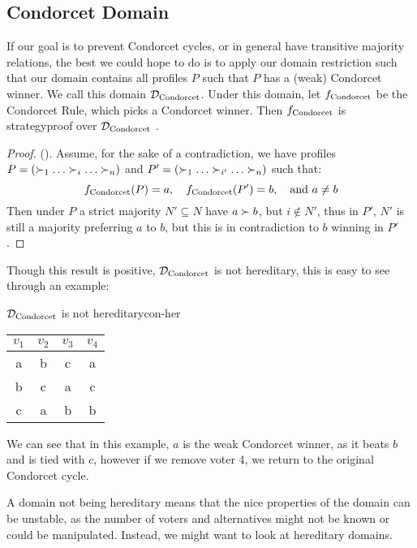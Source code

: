 \subsection{Condorcet Domain}
If our goal is to prevent Condorcet cycles, or in general have transitive majority relations, the best we could hope to do is to apply our domain restriction such that our domain contains all profiles $P$ such that $P$ has a (weak) Condorcet winner. We call this domain $\mathcal{D}_{\text{Condorcet}}$. Under this domain, let $f_{\text{Condorcet}}$ be the Condorcet Rule, which picks a Condorcet winner. Then $f_{\text{Condorcet}}$ is strategyproof over $\mathcal{D}_{\text{Condorcet}}$ \citep{Elkind_Lackner_Peters_2022}.

\begin{proof}{(\citet{Elkind_Lackner_Peters_2022}).} 
	Assume, for the sake of a contradiction, we have profiles $P = (\pref_1 \dots \pref_i \dots \pref_n)$ and $P' = (\pref_1 \dots \pref_{i'} \dots \pref_n)$ such that:
	\[
		f_{\text{Condorcet}}(P) = a, \quad f_{\text{Condorcet}}(P') = b, \quad \text{and } a \neq b
	\]
	Then under $P$ a strict majority $N' \subseteq N$ have $a \succ b$, but $i \notin N'$, thus in $P'$, $N'$ is still a majority preferring $a$ to $b$, but this is in contradiction to $b$ winning in $P'$.
\end{proof}


Though this result is positive, $\mathcal{D}_{\text{Condorcet}}$ is not hereditary, this is easy to see through an example:
\begin{example}{$\mathcal{D}_{\text{Condorcet}}$ is not hereditary}{con-her}
	\begin{minipage}{0.25\linewidth}
		\begin{tabular}{cccc}
			\toprule
			$v_1$ & $v_2$ & $v_3$ & $v_4$  \\
			\midrule
			a & b & c & a \\
			b & c & a & c \\
			c & a & b & b \\
			\bottomrule
		\end{tabular}
	\end{minipage}
	\begin{minipage}[b]{0.70\linewidth}
		We can see that in this example, $a$ is the weak Condorcet winner, as it beats $b$ and is tied with $c$, however if we remove voter 4, we return to the original Condorcet cycle.
	\end{minipage}
\end{example}

A domain not being hereditary means that the nice properties of the domain can be unstable, as the number of voters and alternatives might not be known or could be manipulated. Instead, we might want to look at hereditary domains.

